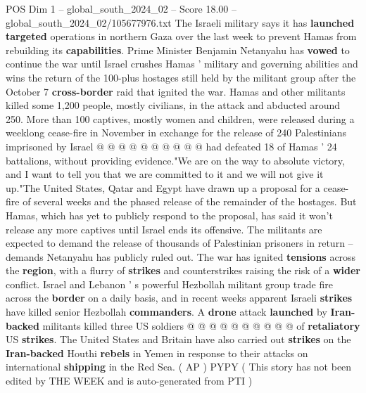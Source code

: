 \begin{textsample}{POS Dim 1 – global\_south\_2024\_02 – Score 18.00 – global\_south\_2024\_02/105677976.txt}
The Israeli military says it has \textbf{launched} \textbf{targeted} operations in northern Gaza over the last week to prevent Hamas from rebuilding its \textbf{capabilities}.
Prime Minister Benjamin Netanyahu has \textbf{vowed} to continue the war until Israel crushes Hamas ' military and governing abilities and wins the return of the 100-plus hostages still held by the militant group after the October 7 \textbf{cross-border} raid that ignited the war.
Hamas and other militants killed some 1,200 people, mostly civilians, in the attack and abducted around 250.
More than 100 captives, mostly women and children, were released during a weeklong cease-fire in November in exchange for the release of 240 Palestinians imprisoned by Israel @ @ @ @ @ @ @ @ @ @ had defeated 18 of Hamas ' 24 battalions, without providing evidence."We are on the way to absolute victory, and I want to tell you that we are committed to it and we will not give it up."The United States, Qatar and Egypt have drawn up a proposal for a cease-fire of several weeks and the phased release of the remainder of the hostages.
But Hamas, which has yet to publicly respond to the proposal, has said it won't release any more captives until Israel ends its offensive.
The militants are expected to demand the release of thousands of Palestinian prisoners in return -- demands Netanyahu has publicly ruled out.
The war has ignited \textbf{tensions} across the \textbf{region}, with a flurry of \textbf{strikes} and counterstrikes raising the risk of a \textbf{wider} conflict.
Israel and Lebanon ' s powerful Hezbollah militant group trade fire across the \textbf{border} on a daily basis, and in recent weeks apparent Israeli \textbf{strikes} have killed senior Hezbollah \textbf{commanders}.
A \textbf{drone} attack \textbf{launched} by \textbf{Iran-backed} militants killed three US soldiers @ @ @ @ @ @ @ @ @ @ of \textbf{retaliatory} US \textbf{strikes}.
The United States and Britain have also carried out \textbf{strikes} on the \textbf{Iran-backed} Houthi \textbf{rebels} in Yemen in response to their attacks on international \textbf{shipping} in the Red Sea. ( AP ) PYPY ( This story has not been edited by THE WEEK and is auto-generated from PTI )

\end{textsample}
